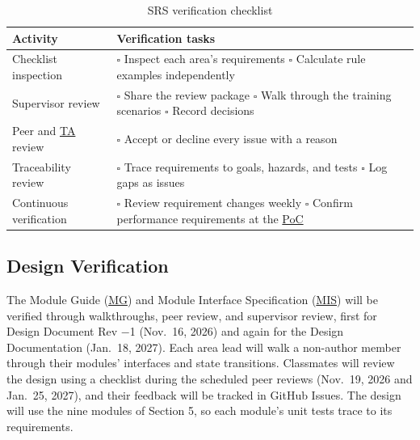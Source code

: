 \documentclass[12pt, titlepage]{article}
\begin{document}
\begin{table}[!htbp]
\centering
\caption{SRS verification checklist}
\label{tab:srs-checklist}
\renewcommand{\arraystretch}{1.3}
\begin{tabularx}{\textwidth}{@{}>{\raggedright\arraybackslash}p{}>{\raggedright\arraybackslash}X@{}}
\toprule
\textbf{Activity} & \textbf{Verification tasks} \\
\midrule
Checklist inspection &
\(\square\) Inspect each area's requirements\newline
\(\square\) Calculate rule examples independently \\
Supervisor review &
\(\square\) Share the review package\newline
\(\square\) Walk through the training scenarios\newline
\(\square\) Record decisions \\
Peer and \hyperlink{abbr:TA}{TA} review &
\(\square\) Accept or decline every issue with a reason \\
Traceability review &
\(\square\) Trace requirements to goals, hazards, and tests\newline
\(\square\) Log gaps as issues \\
Continuous verification &
\(\square\) Review requirement changes weekly\newline
\(\square\) Confirm performance requirements at the \hyperlink{abbr:PoC}{PoC} \\
\bottomrule
\end{tabularx}
\end{table}

\subsection{Design Verification}

The Module Guide (\hyperlink{abbr:MG}{MG}) and Module Interface Specification (\hyperlink{abbr:MIS}{MIS}) will be verified through
walkthroughs, peer review, and supervisor review, first for Design Document Rev \(-\)1
(Nov.~16, 2026) and again for the Design Documentation (Jan.~18, 2027). Each area lead
will walk a non-author member through their modules' interfaces and state transitions.
Classmates will review the design using a checklist during the scheduled peer reviews
(Nov.~19, 2026 and Jan.~25, 2027), and their feedback will be tracked in GitHub Issues.
The design will use the nine modules of Section 5, so each module's unit tests trace to
its requirements.
\end{document}
